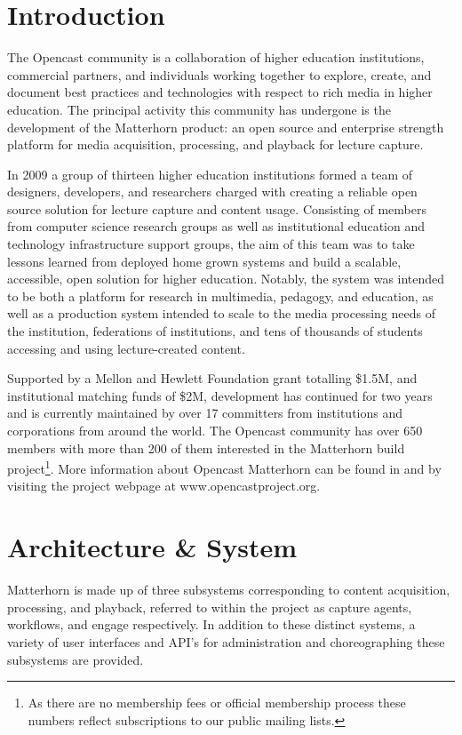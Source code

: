 \documentclass{sig-alternate}
\begin{document}

\section{Introduction}
The Opencast community is a collaboration of higher education institutions, commercial partners, and individuals working together to explore, create, and document best practices and technologies with respect to rich media in higher education.  The principal activity this community has undergone is the development of the Matterhorn product: an open source and enterprise strength platform for media acquisition, processing, and playback for lecture capture.

In 2009 a group of thirteen higher education institutions formed a team of designers, developers, and researchers charged with creating a reliable open source solution for lecture capture and content usage.  Consisting of members from computer science research groups as well as institutional education and technology infrastructure support groups, the aim of this team was to take lessons learned from deployed home grown systems and build a scalable, accessible, open solution for higher education.  Notably, the system was intended to be both a platform for research in multimedia, pedagogy, and education, as well as a production system intended to scale to the media processing needs of the institution, federations of institutions, and tens of thousands of students accessing and using lecture-created content.

Supported by a Mellon and Hewlett Foundation grant totalling \$1.5M, and institutional matching funds of \$2M, development has continued for two years and is currently maintained by over 17 committers from institutions and corporations from around the world.  The Opencast community has over 650 members with more than 200 of them interested in the Matterhorn build project\footnote{As there are no membership fees or official membership process these numbers reflect subscriptions to our public mailing lists.}. More information about Opencast Matterhorn can be found in \cite{DBLP:journals/itse/KetterlSH10} and by visiting the project webpage at www.opencastproject.org. 

\section{Architecture \& System}
Matterhorn is made up of three subsystems corresponding to content acquisition, processing, and playback, referred to within the project as capture agents, workflows, and engage respectively.  In addition to these distinct systems, a variety of user interfaces and API's for administration and choreographing these subsystems are provided.  
\end{document}
